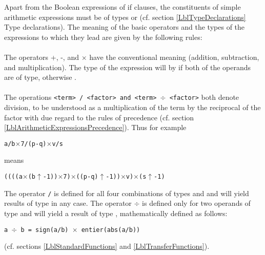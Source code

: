 \documentclass[a4paper,11pt]{article}
\begin{document}
Apart from the Boolean expressions of if clauses, the constituents of
simple arithmetic expressions must be of types  or
 (cf. section \ref{LblTypeDeclarations} Type
declarations).  The meaning of the basic operators and the types of
the expressions to which they lead are given by the following rules:

\paragraph{} \label{LblOperatorsAndTypesP1}
The operators +, -, and $\times$ have the conventional meaning
(addition, subtraction, and multiplication).  The type of the
expression will by  if both of the operands are of
 type, otherwise .

\paragraph{} \label{LblOperatorsAndTypesP2}
The operations \texttt{<term> / <factor> and <term> $\div$ <factor>}
both denote division, to be understood as a multiplication of the term
by the reciprocal of the factor with due regard to the rules of
precedence (cf. section \ref{LblArithmeticExpressionsPrecedence}).
Thus for example

\begin{flushleft}
\texttt{a/b$\times$7/(p-q)$\times$v/s}\\
\end{flushleft}

means

\begin{flushleft}
\texttt{((((a$\times$(b$\uparrow$-1))$\times$7)$\times$((p-q)$\uparrow$-1))$\times$v)$\times$(s$\uparrow$-1)}\\
\end{flushleft}

The operator \texttt{/} is defined for all four combinations of types
 and  and will yield results of 
type in any case.  The operator $\div$ is defined only for two
operands of type  and will yield a result of type
, mathematically defined as follows:

\begin{flushleft}
\texttt{a $\div$ b = sign(a/b) $\times$ entier(abs(a/b))}\\
\end{flushleft}

(cf. sections \ref{LblStandardFunctions} and \ref{LblTransferFunctions}).
\end{document}
